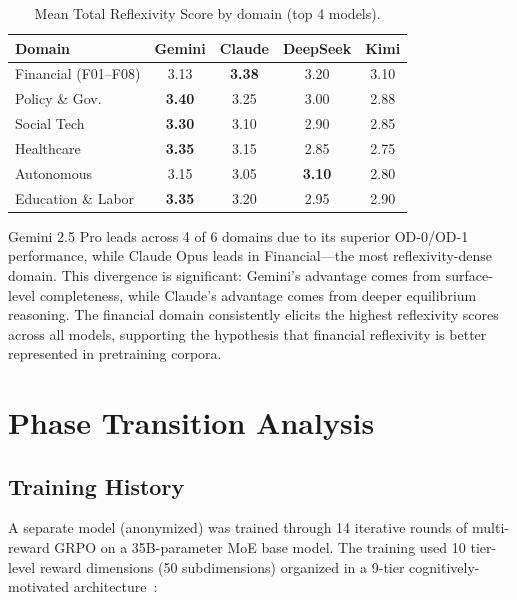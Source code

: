 \documentclass{article}
\begin{document}
\begin{table}[h]
\centering
\caption{Mean Total Reflexivity Score by domain (top 4 models).}
\label{tab:domain-breakdown}
\begin{tabular}{@{}lcccc@{}}
\toprule
\textbf{Domain} & \textbf{Gemini} & \textbf{Claude} & \textbf{DeepSeek} & \textbf{Kimi} \\
\midrule
Financial (F01--F08) & 3.13 & \textbf{3.38} & 3.20 & 3.10 \\
Policy \& Gov. & \textbf{3.40} & 3.25 & 3.00 & 2.88 \\
Social Tech & \textbf{3.30} & 3.10 & 2.90 & 2.85 \\
Healthcare & \textbf{3.35} & 3.15 & 2.85 & 2.75 \\
Autonomous & 3.15 & 3.05 & \textbf{3.10} & 2.80 \\
Education \& Labor & \textbf{3.35} & 3.20 & 2.95 & 2.90 \\
\bottomrule
\end{tabular}
\end{table}

Gemini 2.5 Pro leads across 4 of 6 domains due to its superior OD-0/OD-1 performance, while Claude Opus leads in Financial---the most reflexivity-dense domain. This divergence is significant: Gemini's advantage comes from surface-level completeness, while Claude's advantage comes from deeper equilibrium reasoning. The financial domain consistently elicits the highest reflexivity scores across all models, supporting the hypothesis that financial reflexivity is better represented in pretraining corpora.

\section{Phase Transition Analysis}
\label{sec:phase-transition}

\subsection{Training History}

A separate model (anonymized) was trained through 14 iterative rounds of multi-reward GRPO on a 35B-parameter MoE base model. The training used 10 tier-level reward dimensions (50 subdimensions) organized in a 9-tier cognitively-motivated architecture~\citep{anon2026}:
\end{document}
